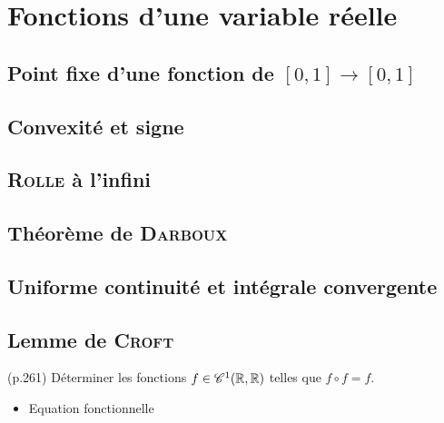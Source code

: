 \chapter{Fonctions d'une variable réelle}



\newpage

\section{Point fixe d'une fonction de \texorpdfstring{$[0, 1] \rightarrow [0, 1]$}{[0, 1] dans [0, 1]}}


\section{Convexité et signe}


\section{\textsc{Rolle} à l'infini}


\section{Théorème de \textsc{Darboux}}


\section{Uniforme continuité et intégrale convergente}


\section{Lemme de \textsc{Croft}}


\begin{exercice}
    \cite{exos_oraux} (p.261)
    Déterminer les fonctions $f \in \mathscr{C}^1(\mathbb{R}, \mathbb{R})$ telles que $f \circ f = f$.
\end{exercice}

\begin{itemize}
    \item Equation fonctionnelle
\end{itemize}
